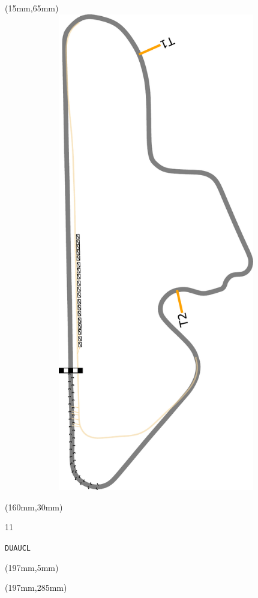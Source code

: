 \begin{textblock*}{185mm}(15mm,65mm)%
\centering
\mbox{\includegraphics[width=185mm,height=210mm,keepaspectratio]{PT/DUAUCL.pdf}}
\end{textblock*}
\begin{textblock*}{40mm}(160mm,30mm)%
\Large
\par{} 
\par11 
\par\hfill\tiny\tt DUAUCL\\
\end{textblock*}
\begin{textblock*}{20mm}(197mm,5mm)%
\fbox{\thepage}
\label{DUAUCL}
\end{textblock*}
\begin{textblock*}{20mm}(197mm,285mm)%
\fbox{\thepage}
\end{textblock*}

